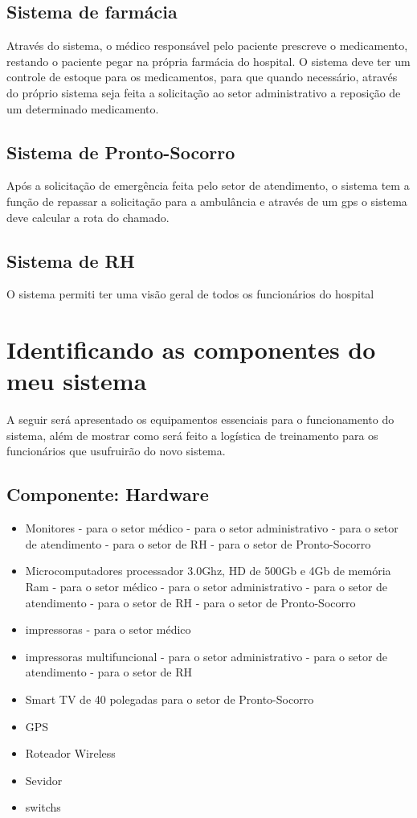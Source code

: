         \subsection{Sistema de farmácia}
Através do sistema, o médico responsável pelo paciente prescreve o medicamento, restando o paciente pegar na própria farmácia do hospital.
O sistema deve ter um controle de estoque para os medicamentos, para que quando necessário, através do próprio sistema seja feita a solicitação ao setor administrativo a reposição de um determinado medicamento.


        \subsection{Sistema de Pronto-Socorro}
Após a solicitação de emergência feita pelo setor de atendimento, o sistema tem a função de repassar a solicitação para a ambulância e através de um gps o sistema deve calcular a rota do chamado.
        \subsection{Sistema de RH}
O sistema permiti ter uma visão geral de todos os funcionários do hospital
 \section{Identificando as componentes do meu sistema}
A seguir será apresentado os equipamentos essenciais para o funcionamento do sistema, além de mostrar como será feito a logística de treinamento para os funcionários que usufruirão do novo sistema.
     \subsection{Componente: Hardware}

\begin{itemize}
\item Monitores
  \subitem -  para o setor médico
  \subitem - para o setor administrativo
  \subitem -  para o setor de atendimento
  \subitem -  para o setor de RH
  \subitem -  para o setor de Pronto-Socorro
  \item  Microcomputadores processador 3.0Ghz, HD de 500Gb e 4Gb de memória Ram
  \subitem -  para o setor médico
  \subitem -  para o setor administrativo
  \subitem -  para o setor de atendimento
  \subitem -  para o setor de RH
  \subitem -  para o setor de Pronto-Socorro
  \item  impressoras
   \subitem - para o setor médico
    \item  impressoras multifuncional
  \subitem -  para o setor administrativo
  \subitem -  para o setor de atendimento
  \subitem -  para o setor de RH
  \item  Smart TV de 40 polegadas
    \subitem para o setor de Pronto-Socorro
  \item  GPS
  \item  Roteador Wireless
  \item  Sevidor
  \item  switchs

\end{itemize}



